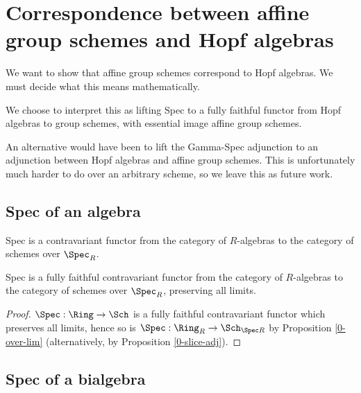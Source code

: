 \section{Correspondence between affine group schemes and Hopf algebras}


We want to show that affine group schemes correspond to Hopf algebras.
We must decide what this means mathematically.

We choose to interpret this as lifting Spec to a fully faithful functor
from Hopf algebras to group schemes,
with essential image affine group schemes.

An alternative would have been to lift the Gamma-Spec adjunction to an adjunction between
Hopf algebras and affine group schemes.
This is unfortunately much harder to do over an arbitrary scheme,
so we leave this as future work.


\subsection{Spec of an algebra}


\begin{definition}
  \label{0-spec-alg}
  \uses{}
  \leanok

  Spec is a contravariant functor from the category of $R$-algebras
  to the category of schemes over $\Spec_R$.
\end{definition}


\begin{proposition}
  \label{0-full-faithful-spec-alg}
  \leanok

  Spec is a fully faithful contravariant functor from the category of $R$-algebras
  to the category of schemes over $\Spec_R$, preserving all limits.
\end{proposition}
\begin{proof}
  \leanok

  $\Spec : \Ring \to \Sch$ is a fully faithful contravariant functor which preserves all limits,
  hence so is $\Spec : \Ring_R \to \Sch_{\Spec R}$ by Proposition \ref{0-over-lim}
  (alternatively, by Proposition \ref{0-slice-adj}).
\end{proof}


\subsection{Spec of a bialgebra}


